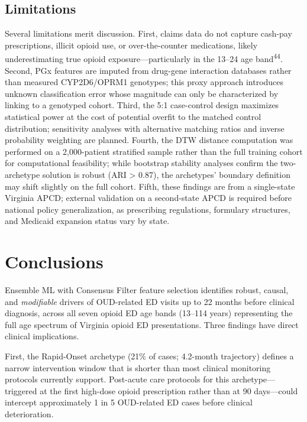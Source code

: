 \documentclass[
  12pt,
]{book}
\begin{document}
\section{Limitations}\label{limitations-1}

Several limitations merit discussion. First, claims data do not capture
cash-pay prescriptions, illicit opioid use, or over-the-counter
medications, likely underestimating true opioid exposure---particularly
in the 13--24 age band\textsuperscript{44}. Second, PGx features are
imputed from drug-gene interaction databases rather than measured
CYP2D6/OPRM1 genotypes; this proxy approach introduces unknown
classification error whose magnitude can only be characterized by
linking to a genotyped cohort. Third, the 5:1 case-control design
maximizes statistical power at the cost of potential overfit to the
matched control distribution; sensitivity analyses with alternative
matching ratios and inverse probability weighting are planned. Fourth,
the DTW distance computation was performed on a 2,000-patient stratified
sample rather than the full training cohort for computational
feasibility; while bootstrap stability analyses confirm the
two-archetype solution is robust (ARI \textgreater{} 0.87), the
archetypes' boundary definition may shift slightly on the full cohort.
Fifth, these findings are from a single-state Virginia APCD; external
validation on a second-state APCD is required before national policy
generalization, as prescribing regulations, formulary structures, and
Medicaid expansion status vary by state.

\chapter{Conclusions}\label{sec-conclusions}

Ensemble ML with Consensus Filter feature selection identifies robust,
causal, and \emph{modifiable} drivers of OUD-related ED visits up to 22
months before clinical diagnosis, across all seven opioid ED age bands
(13--114 years) representing the full age spectrum of Virginia opioid ED
presentations. Three findings have direct clinical implications.

First, the Rapid-Onset archetype (21\% of cases; 4.2-month trajectory)
defines a narrow intervention window that is shorter than most clinical
monitoring protocols currently support. Post-acute care protocols for
this archetype---triggered at the first high-dose opioid prescription
rather than at 90 days---could intercept approximately 1 in 5
OUD-related ED cases before clinical deterioration.
\end{document}
